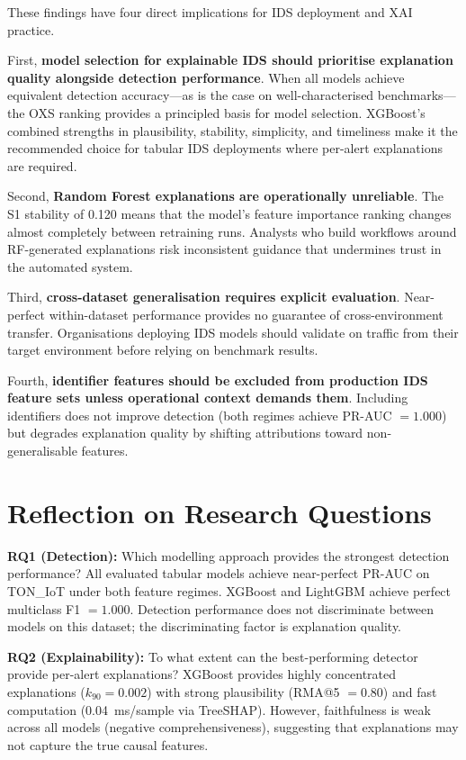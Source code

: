 \documentclass[12pt,a4paper]{report}
\begin{document}
These findings have four direct implications for IDS deployment and XAI practice.

First, \textbf{model selection for explainable IDS should prioritise explanation quality alongside detection performance}. When all models achieve equivalent detection accuracy---as is the case on well-characterised benchmarks---the OXS ranking provides a principled basis for model selection. XGBoost's combined strengths in plausibility, stability, simplicity, and timeliness make it the recommended choice for tabular IDS deployments where per-alert explanations are required.

Second, \textbf{Random Forest explanations are operationally unreliable}. The S1 stability of 0.120 means that the model's feature importance ranking changes almost completely between retraining runs. Analysts who build workflows around RF-generated explanations risk inconsistent guidance that undermines trust in the automated system.

Third, \textbf{cross-dataset generalisation requires explicit evaluation}. Near-perfect within-dataset performance provides no guarantee of cross-environment transfer. Organisations deploying IDS models should validate on traffic from their target environment before relying on benchmark results.

Fourth, \textbf{identifier features should be excluded from production IDS feature sets unless operational context demands them}. Including identifiers does not improve detection (both regimes achieve PR-AUC $= 1.000$) but degrades explanation quality by shifting attributions toward non-generalisable features.

\section{Reflection on Research Questions}
\label{sec:rq-reflection}

\textbf{RQ1 (Detection):} Which modelling approach provides the strongest detection performance? All evaluated tabular models achieve near-perfect PR-AUC on TON\_IoT under both feature regimes. XGBoost and LightGBM achieve perfect multiclass F1 $= 1.000$. Detection performance does not discriminate between models on this dataset; the discriminating factor is explanation quality.

\textbf{RQ2 (Explainability):} To what extent can the best-performing detector provide per-alert explanations? XGBoost provides highly concentrated explanations ($k_{90} = 0.002$) with strong plausibility (RMA@5 $= 0.80$) and fast computation (0.04~ms/sample via TreeSHAP). However, faithfulness is weak across all models (negative comprehensiveness), suggesting that explanations may not capture the true causal features.
\end{document}
